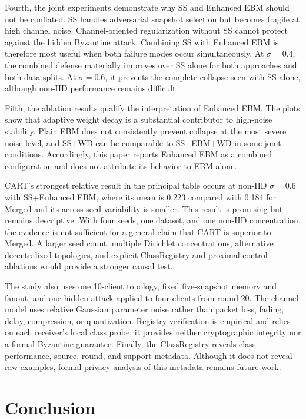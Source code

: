 \documentclass[conference]{IEEEtran}
\begin{document}
Fourth, the joint experiments demonstrate why SS and Enhanced EBM should not be conflated. SS handles adversarial snapshot selection but becomes fragile at high channel noise. Channel-oriented regularization without SS cannot protect against the hidden Byzantine attack. Combining SS with Enhanced EBM is therefore most useful when both failure modes occur simultaneously. At $\sigma=0.4$, the combined defense materially improves over SS alone for both approaches and both data splits. At $\sigma=0.6$, it prevents the complete collapse seen with SS alone, although non-IID performance remains difficult.

Fifth, the ablation results qualify the interpretation of Enhanced EBM. The plots show that adaptive weight decay is a substantial contributor to high-noise stability. Plain EBM does not consistently prevent collapse at the most severe noise level, and SS+WD can be comparable to SS+EBM+WD in some joint conditions. Accordingly, this paper reports Enhanced EBM as a combined configuration and does not attribute its behavior to EBM alone.

CART's strongest relative result in the principal table occurs at non-IID $\sigma=0.6$ with SS+Enhanced EBM, where its mean is 0.223 compared with 0.184 for Merged and its across-seed variability is smaller. This result is promising but remains descriptive. With four seeds, one dataset, and one non-IID concentration, the evidence is not sufficient for a general claim that CART is superior to Merged. A larger seed count, multiple Dirichlet concentrations, alternative decentralized topologies, and explicit ClassRegistry and proximal-control ablations would provide a stronger causal test.

The study also uses one 10-client topology, fixed five-snapshot memory and fanout, and one hidden attack applied to four clients from round 20. The channel model uses relative Gaussian parameter noise rather than packet loss, fading, delay, compression, or quantization. Registry verification is empirical and relies on each receiver's local class probe; it provides neither cryptographic integrity nor a formal Byzantine guarantee. Finally, the ClassRegistry reveals class-performance, source, round, and support metadata. Although it does not reveal raw examples, formal privacy analysis of this metadata remains future work.

\section{Conclusion}
\end{document}
